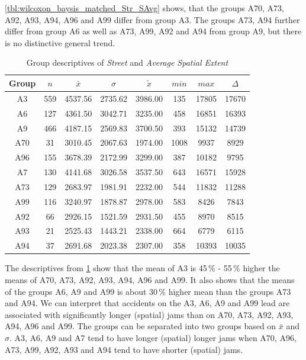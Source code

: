 \cref{tbl:wilcoxon_baysis_matched_Str_SAvg} shows, that the groups A70, A73, A92, A93, A94, A96 and A99 differ from group A3. The groups A73, A94 further differ from group A6 as well as A73, A99, A92 and A94 from group A9, but there is no distinctive general trend.
\begin{table}[ht!]
	\tiny
	\centering
	\begin{tabular}{c|c|c|c|c|c|c|c}
	  	\toprule
	 	Group & $n$ & $\bar{x}$ & $\sigma$ & $\tilde{x}$ & $min$ & $max$ & $\Delta$ \\  
	  	\midrule
		A3  & 559 & 4537.56 & 2735.62 & 3986.00 & 135  & 17805 & 17670 \\ 
	  	A6  & 127 & 4361.50 & 3042.71 & 3235.00 & 458  & 16851 & 16393 \\ 
	  	A9  & 466 & 4187.15 & 2569.83 & 3700.50 & 393  & 15132 & 14739 \\ 
	  	A70 & 31  & 3010.45 & 2067.63 & 1974.00 & 1008 & 9937  & 8929 \\ 
	  	A96 & 155 & 3678.39 & 2172.99 & 3299.00 & 387  & 10182 & 9795 \\ 
	  	A7  & 130 & 4141.68 & 3026.58 & 3537.50 & 643  & 16571 & 15928 \\ 
	  	A73 & 129 & 2683.97 & 1981.91 & 2232.00 & 544  & 11832 & 11288 \\ 
	  	A99 & 116 & 3240.97 & 1878.87 & 2978.00 & 583  & 8426  & 7843 \\ 
	  	A92 & 66  & 2926.15 & 1521.59 & 2931.50 & 455  & 8970  & 8515 \\ 
	  	A93 & 21  & 2525.43 & 1443.21 & 2338.00 & 664  & 6779  & 6115 \\ 
	  	A94 & 37  & 2691.68 & 2023.38 & 2307.00 & 358  & 10393 & 10035 \\ 
	   	\bottomrule
	\end{tabular}
	\caption{Group descriptives of \textit{Street} and \textit{Average Spatial Extent}}
	\label{tbl:descriptives_baysis_matched_Str_SAvg}
\end{table}
The descriptives from \cref{tbl:descriptives_baysis_matched_Str_SAvg} show that the mean of A3 is 45\,\% - 55\,\% higher the means of A70, A73, A92, A93, A94, A96 and A99. It also shows that the means of the groups A6, A9 and A99 is about 30\,\% higher mean than the groups A73 and A94. We can interpret that accidents on the A3, A6, A9 and A99 lead are associated with significantly longer (spatial) jams than on A70, A73, A92, A93, A94, A96 and A99. The groups can be separated into two groups based on $\bar{x}$ and $\sigma$. A3, A6, A9 and A7 tend to have longer (spatial) longer jams when A70, A96, A73, A99, A92, A93 and A94 tend to have shorter (spatial) jams.

